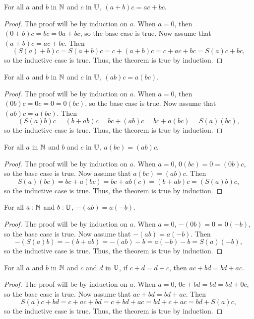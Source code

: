 \documentclass[../../math.tex]{subfiles}
\begin{document}
\begin{theorem}
    For all $a$ and $b$ in $\mathbb{N}$ and $c$ in $\mathbb{U}$, $(a + b)c = ac + bc$.
\end{theorem}
\begin{proof}
    The proof will be by induction on $a$.  When $a = 0$, then $(0 + b)c = bc =
    0a + bc$, so the base case is true.  Now assume that $(a + b)c = ac + bc$.
    Then
    \[
        (S(a) + b)c = S(a + b)c = c + (a + b)c = c + ac + bc = S(a)c + bc,
    \]
    so the inductive case is true.  Thus, the theorem is true by induction.
\end{proof}

\begin{theorem}
    For all $a$ and $b$ in $\mathbb{N}$ and $c$ in $\mathbb{U}$, $(ab)c = a(bc)$.
\end{theorem}
\begin{proof}
    The proof will be by induction on $a$.  When $a = 0$, then $(0b)c = 0c = 0 =
    0(bc)$, so the base case is true.  Now assume that $(ab)c = a(bc)$.
    Then
    \[
        (S(a)b)c = (b + ab)c = bc + (ab)c = bc + a(bc) = S(a)(bc),
    \]
    so the inductive case is true.  Thus, the theorem is true by induction.
\end{proof}

\begin{theorem}
    For all $a$ in $\mathbb{N}$ and $b$ and $c$ in $\mathbb{U}$, $a(bc) = (ab)c$.
\end{theorem}
\begin{proof}
    The proof will be by induction on $a$.  When $a = 0$, $0(bc) = 0 = (0b)c$,
    so the base case is true.  Now assume that $a(bc) = (ab)c$.  Then
    \[
        S(a)(bc) = bc + a(bc) = bc + ab(c) = (b + ab)c = (S(a)b)c,
    \]
    so the inductive case is true.  Thus, the theorem is true by induction.
\end{proof}

\begin{theorem}
    For all $a : \mathbb{N}$ and $b : \mathbb{U}$, $-(ab) = a(-b)$.
\end{theorem}
\begin{proof}
    The proof will be by induction on $a$.  When $a = 0$, $-(0b) = 0 = 0(-b)$,
    so the base case is true.  Now assume that $-(ab) = a(-b)$.  Then
    \[
        -(S(a)b) = -(b + ab) = -(ab) - b = a(-b) - b = S(a)(-b),
    \]
    so the inductive case is true.  Thus, the theorem is true by induction.
\end{proof}

\begin{theorem} \label{nat_mult_commute_double}
    For all $a$ and $b$ in $\mathbb{N}$ and $c$ and $d$ in $\mathbb{U}$, if $c + d = d + c$,
    then $ac + bd = bd + ac$.
\end{theorem}
\begin{proof}
    The proof will be by induction on $a$.  When $a = 0$, $0c + bd = bd = bd +
    0c$, so the base case is true.  Now assume that $ac + bd = bd + ac$.  Then
    \[
        S(a)c + bd = c + ac + bd = c + bd + ac = bd + c + ac = bd + S(a)c,
    \]
    so the inductive case is true.  Thus, the theorem is true by induction.
\end{proof}
\end{document}
